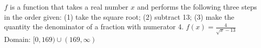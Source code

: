 {$f$ is a function that takes a real number $x$ and performs the following three steps in the order given: (1) take the square root; (2) subtract 13; (3) make the quantity the denominator of a fraction with numerator 4. 
}
{ $f(x) = \frac{4}{\sqrt{x} - 13}$ \\ Domain: $[0, 169) \cup (169, \infty)$}